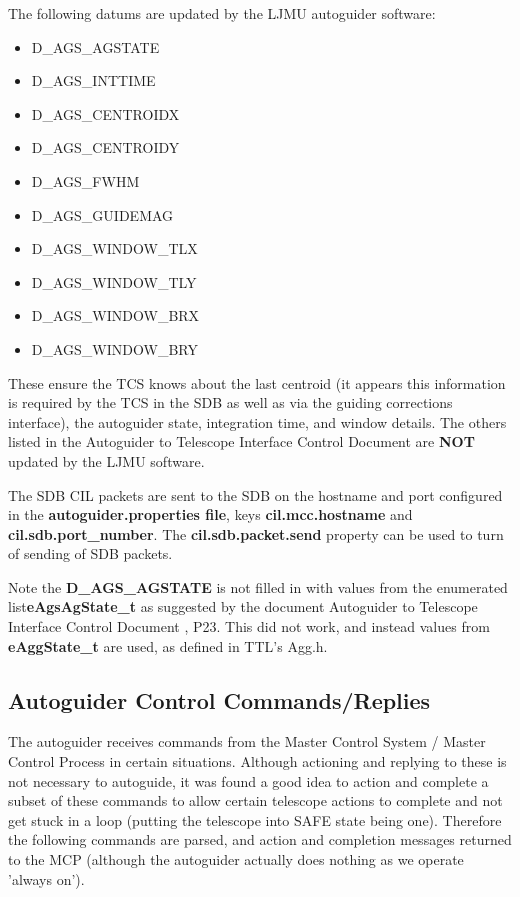 \documentclass[10pt,a4paper]{article}
\begin{document}
The following datums are updated by the LJMU autoguider software:
\begin{itemize}
\item D\_AGS\_AGSTATE
\item D\_AGS\_INTTIME
\item D\_AGS\_CENTROIDX
\item D\_AGS\_CENTROIDY
\item D\_AGS\_FWHM
\item D\_AGS\_GUIDEMAG
\item D\_AGS\_WINDOW\_TLX
\item D\_AGS\_WINDOW\_TLY
\item D\_AGS\_WINDOW\_BRX
\item D\_AGS\_WINDOW\_BRY
\end{itemize}
These ensure the TCS knows about the last centroid (it appears this information is required by the TCS in the SDB as well as via the guiding corrections interface), the autoguider state, integration time, and window details. The others listed in the Autoguider to Telescope Interface Control Document \cite{bib:agtcsicd} are {\bf NOT} updated by the LJMU software.

The SDB CIL packets are sent to the SDB on the hostname and port configured in the {\bf autoguider.properties file}, keys {\bf cil.mcc.hostname} and {\bf cil.sdb.port\_number}. The {\bf cil.sdb.packet.send} property can be used to turn of sending of SDB packets.

Note the {\bf D\_AGS\_AGSTATE} is not filled in with values from the enumerated list{\bf  eAgsAgState\_t} as suggested by the document Autoguider to Telescope Interface Control Document \cite{bib:agtcsicd}, P23. This did not work, and instead values from {\bf eAggState\_t} are used, as defined in TTL's Agg.h.

\subsection{Autoguider Control Commands/Replies}

The autoguider receives commands from the Master Control System / Master Control Process in certain situations. Although actioning and replying to these is not necessary to autoguide, it was found a good idea to action and complete a subset of these commands to allow certain telescope actions to complete and not get stuck in a loop (putting the telescope into SAFE state being one). Therefore  the following commands are parsed, and action and completion messages returned to the MCP (although the autoguider actually does nothing as we operate 'always on').
\end{document}
